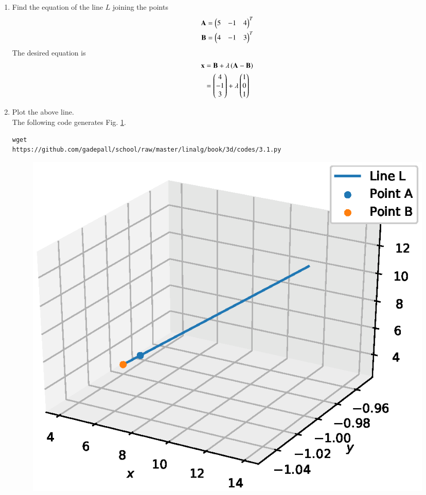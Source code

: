 \renewcommand{\theequation}{\theenumi}
\begin{enumerate}[label=\arabic*.,ref=\thesubsection.\theenumi]

%
\item Find the equation of the line $L$ joining the points 
\begin{align}
\mathbf{A}=\begin{pmatrix}5 & -1 &4\end{pmatrix}^T
\\
\mathbf{B}=\begin{pmatrix}4 & -1 & 3\end{pmatrix}^T
\end{align}
\solution The desired equation is
\begin{align}
\mathbf{x} &= \mathbf{B} + \lambda\left(\mathbf{A}-\mathbf{B}\right)
\\
&= \begin{pmatrix}4 \\ -1 \\ 3\end{pmatrix} + \lambda \begin{pmatrix}1 \\ 0 \\ 1\end{pmatrix}
\label{eq:Lproj}
\end{align}
\item Plot the above line. 
\\
\solution The following code generates Fig. \ref{fig:3.1}.
\begin{lstlisting}
wget 
https://github.com/gadepall/school/raw/master/linalg/book/3d/codes/3.1.py
\end{lstlisting}
\begin{figure}[!ht]
\centering
\includegraphics[width=\columnwidth]{./3d/figs/3.1.eps}
\caption{}
\label{fig:3.1}
\end{figure}

\end{enumerate}
